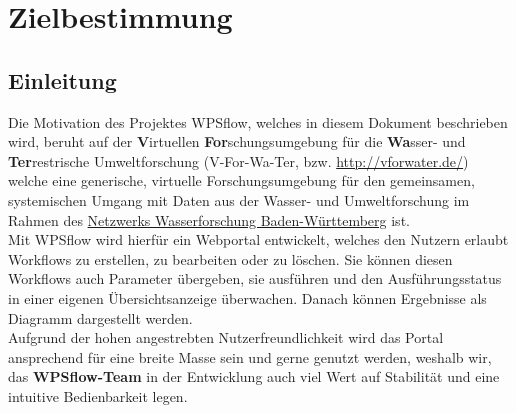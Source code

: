 
 
	\chapter{Zielbestimmung}
	
	    \section{Einleitung}
		    
		    Die Motivation des Projektes WPSflow, welches in diesem Dokument beschrieben wird, beruht auf der \textbf{V}irtuellen \textbf{For}schungsumgebung für die \textbf{Wa}sser- und \textbf{Ter}restrische Umweltforschung (V-For-Wa-Ter, bzw. \url{http://vforwater.de/}) welche eine generische, virtuelle Forschungsumgebung für den gemeinsamen, systemischen Umgang mit Daten aus der Wasser- und Umweltforschung im Rahmen des \href{http://www.wassernetzwerk-bw.de/}{Netzwerks Wasserforschung Baden-Württemberg} ist.\\
		    Mit WPSflow wird hierfür ein Webportal entwickelt, welches den Nutzern erlaubt \Gls{Workflow}s zu erstellen, zu bearbeiten oder zu löschen. Sie können diesen Workflows auch Parameter übergeben, sie ausführen und den Ausführungsstatus in einer eigenen Übersichtsanzeige überwachen. Danach können Ergebnisse als Diagramm dargestellt werden.\\
		    Aufgrund der hohen angestrebten Nutzerfreundlichkeit wird das Portal ansprechend für eine breite Masse sein und gerne genutzt werden, weshalb wir, das \textbf{WPSflow-Team} in der Entwicklung auch viel Wert auf Stabilität und eine intuitive Bedienbarkeit legen.
		    
		    \vspace{.5cm}
		    
	    
	    
		
		    
